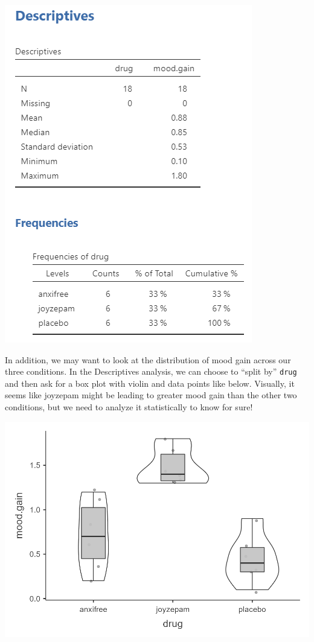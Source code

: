 \documentclass[
]{book}
\begin{document}
\includegraphics{images/04_one-way-anova/anova_descriptives.png}

In addition, we may want to look at the distribution of mood gain across our three conditions. In the Descriptives analysis, we can choose to ``split by'' \texttt{drug} and then ask for a box plot with violin and data points like below. Visually, it seems like joyzepam might be leading to greater mood gain than the other two conditions, but we need to analyze it statistically to know for sure!

\includegraphics{images/04_one-way-anova/anova_graph.png}
\end{document}
